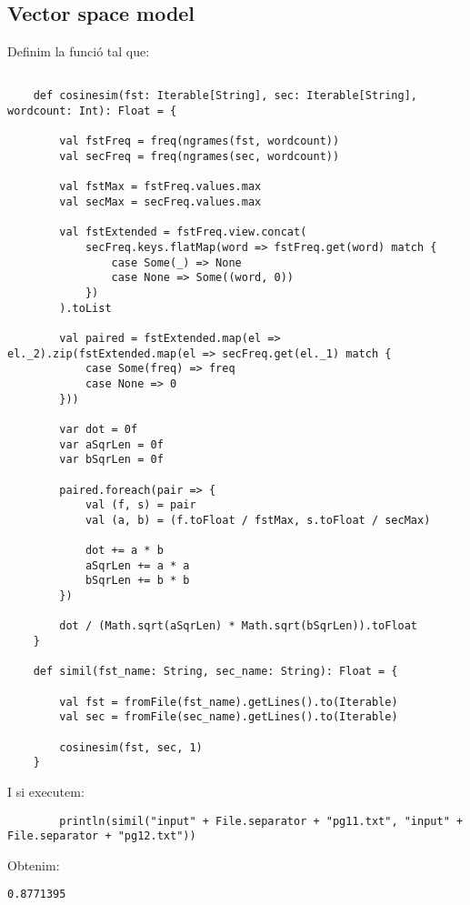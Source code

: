 \documentclass{article}
\begin{document}
\subsection{Vector space model}

Definim la funció tal que:

\begin{lstlisting}

    def cosinesim(fst: Iterable[String], sec: Iterable[String], wordcount: Int): Float = {

        val fstFreq = freq(ngrames(fst, wordcount))
        val secFreq = freq(ngrames(sec, wordcount))

        val fstMax = fstFreq.values.max
        val secMax = secFreq.values.max

        val fstExtended = fstFreq.view.concat(
            secFreq.keys.flatMap(word => fstFreq.get(word) match {
                case Some(_) => None
                case None => Some((word, 0))
            })
        ).toList

        val paired = fstExtended.map(el => el._2).zip(fstExtended.map(el => secFreq.get(el._1) match {
            case Some(freq) => freq
            case None => 0
        }))

        var dot = 0f
        var aSqrLen = 0f
        var bSqrLen = 0f

        paired.foreach(pair => {
            val (f, s) = pair
            val (a, b) = (f.toFloat / fstMax, s.toFloat / secMax)

            dot += a * b
            aSqrLen += a * a
            bSqrLen += b * b
        })

        dot / (Math.sqrt(aSqrLen) * Math.sqrt(bSqrLen)).toFloat
    }

    def simil(fst_name: String, sec_name: String): Float = {

        val fst = fromFile(fst_name).getLines().to(Iterable)
        val sec = fromFile(sec_name).getLines().to(Iterable)

        cosinesim(fst, sec, 1)
    }
\end{lstlisting}

I si executem:

\begin{lstlisting}
        println(simil("input" + File.separator + "pg11.txt", "input" + File.separator + "pg12.txt"))
\end{lstlisting}

Obtenim:

\begin{verbatim}
0.8771395
\end{verbatim}
\end{document}
